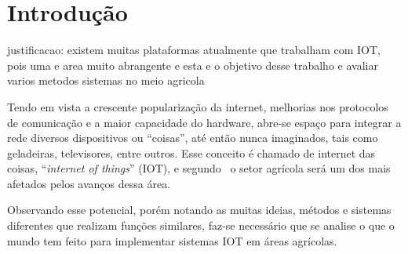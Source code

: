 \documentclass[
	article,			%
	12pt,				%
	oneside,			%
	a4paper,			%
	english,			%
	brazil,				%
	sumario=tradicional
	]{abntex2}
\begin{document}
\cleardoublepage


\textual
\section{Introdução}
justificacao: existem muitas plataformas atualmente que trabalham com IOT, pois uma e area muito abrangente e esta  e o objetivo desse trabalho e avaliar varios metodos sistemas no meio agricola

Tendo em vista a crescente popularização da internet, melhorias nos protocolos de comunicação e a maior capacidade do hardware, abre-se espaço para integrar a rede diversos dispositivos ou ``coisas'', até então nunca imaginados, tais como geladeiras, televisores, entre outros. Esse conceito é chamado de internet das coisas, ``\textit{internet of things}'' (IOT), e segundo~\citeauthor{5} o setor agrícola será um dos mais afetados pelos avanços dessa área.

Observando esse potencial, porém notando as muitas ideias, métodos e sistemas diferentes que realizam funções similares, faz-se necessário que se analise o que o mundo tem feito para implementar sistemas IOT em áreas agrícolas.
\end{document}
